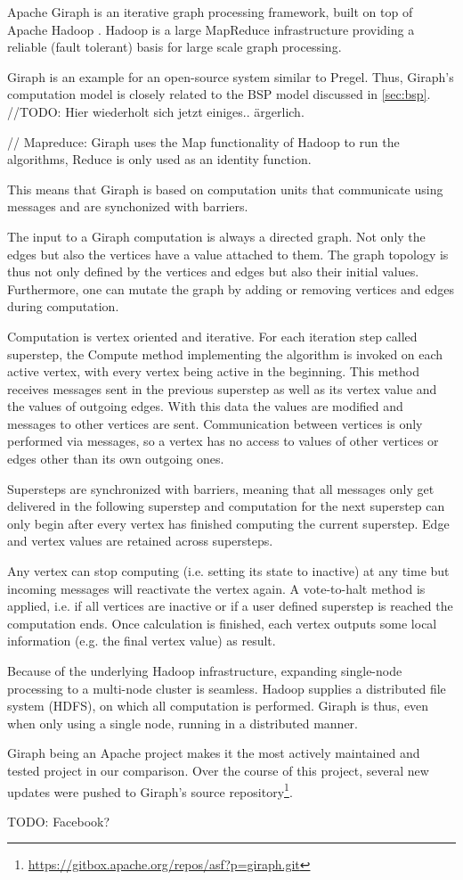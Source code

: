 

Apache Giraph is an iterative graph processing framework, built on top of Apache Hadoop \cite{Giraph}. Hadoop is a large MapReduce infrastructure providing a reliable (fault tolerant) basis for large scale graph processing.

Giraph is an example for an open-source system similar to Pregel.
Thus, Giraph's computation model is closely related to the BSP model discussed in \autoref{sec:bsp}. 
//TODO: Hier wiederholt sich jetzt einiges.. ärgerlich.

// Mapreduce: Giraph uses the Map functionality of Hadoop to run the algorithms, Reduce is only used as an identity function.

This means that Giraph is based on computation units that communicate using messages and are synchonized with barriers.

The input to a Giraph computation is always a directed graph. Not only the edges but also the vertices have a value attached to them. The graph topology is thus not only defined by the vertices and edges but also their initial values.
Furthermore, one can mutate the graph by adding or removing vertices and edges during computation.

Computation is vertex oriented and iterative.
For each iteration step called superstep, the Compute method implementing the algorithm is invoked on each active vertex, with every vertex being active in the beginning.
This method receives messages sent in the previous superstep as well as its vertex value and the values of outgoing edges.
With this data the values are modified and messages to other vertices are sent.
Communication between vertices is only performed via messages, so a vertex has no access to values of other vertices or edges other than its own outgoing ones.

Supersteps are synchronized with barriers, meaning that all messages only get delivered in the following superstep and computation for the next superstep can only begin after every vertex has finished computing the current superstep.
Edge and vertex values are retained across supersteps.

Any vertex can stop computing (i.e. setting its state to inactive) at any time but incoming messages will reactivate the vertex again.
A vote-to-halt method is applied, i.e. if all vertices are inactive or if a user defined superstep is reached the computation ends.
Once calculation is finished, each vertex outputs some local information (e.g. the final vertex value) as result.

Because of the underlying Hadoop infrastructure, expanding single-node processing to a multi-node cluster is seamless. Hadoop supplies a distributed file system (HDFS), on which all computation is performed. Giraph is thus, even when only using a single node, running in a distributed manner.

Giraph being an Apache project makes it the most actively maintained and tested project in our comparison. Over the course of this project, several new updates were pushed to Giraph's source repository\footnote{\url{https://gitbox.apache.org/repos/asf?p=giraph.git}}.

TODO: Facebook?
